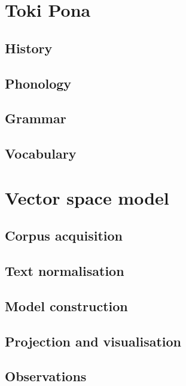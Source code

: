 \documentclass[14pt, a4paper]{extreport}
\begin{document}
\section{Toki Pona}

\subsection{History}

\subsection{Phonology}

\subsection{Grammar}

\subsection{Vocabulary}

\section{Vector space model}

\subsection{Corpus acquisition}

\subsection{Text normalisation}

\subsection{Model construction}

\subsection{Projection and visualisation}

\subsection{Observations}

%
%




\printbibliography[heading=bibintoc,title={References}]
\end{document}
